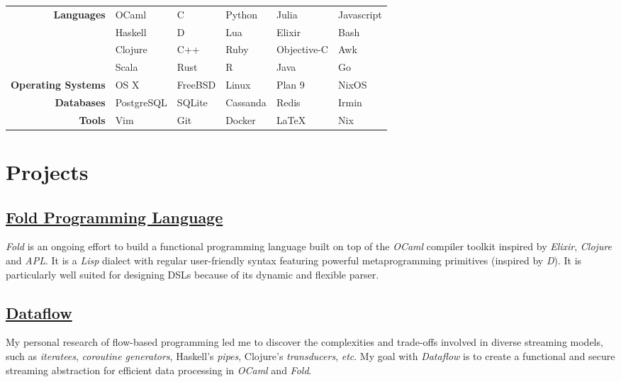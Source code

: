\documentclass{resume}
\begin{document}
\begin{spacing}{1.5}
\setlength{\tabcolsep}{14pt}
\noindent\begin{tabular}{r | l l l l l}
  \bfseries Languages         & OCaml     & C       &  Python  & Julia       & Javascript \\
                              & Haskell   & D       &  Lua     & Elixir      & Bash       \\
                              & Clojure   & C++     &  Ruby    & Objective-C & Awk        \\
                              & Scala     & Rust    &  R       & Java        & Go         \\
  \hline
  \bfseries Operating Systems & OS X      & FreeBSD &  Linux   & Plan 9      & NixOS      \\
  \hline
  \bfseries Databases         & PostgreSQL & SQLite  & Cassanda & Redis       & Irmin      \\
  \hline
  \bfseries Tools             & Vim        & Git     & Docker   & \LaTeX      & Nix        \\
\end{tabular}
\end{spacing}

\section{\Palatino\bfseries Projects}
\subsection{\href{http://github.com/fold-lang}{\faGithub\bfseries\space Fold Programming Language}}
{\em Fold} is an ongoing effort to build a functional programming language built on top of the {\em OCaml} compiler toolkit inspired by {\em Elixir}, {\em Clojure} and {\em APL}. It is a {\em Lisp} dialect with regular user-friendly syntax featuring powerful metaprogramming primitives (inspired by {\em D}). It is particularly well suited for designing DSLs because of its dynamic and flexible parser.

\subsection{\href{http://github.com/rizo/dataflow}{\faGithub\bfseries\space Dataflow}}
My personal research of flow-based programming led me to discover the complexities and trade-offs involved in diverse streaming models, such as {\em iteratees}, {\em coroutine generators}, Haskell's {\em pipes}, Clojure's {\em transducers}, {\em etc}. My goal with {\em Dataflow} is to create a functional and secure streaming abstraction for efficient data processing in {\em OCaml} and {\em Fold}.
\end{document}
